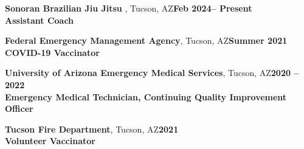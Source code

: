 \textbf{Sonoran Brazilian Jiu Jitsu }, Tucson, AZ\hfill\textbf{Feb 2024-- Present}\\
\textbf{Assistant Coach}\hfill
\vspace{-3mm}\\\vspace{-1mm}

\textbf{Federal Emergency Management Agency}, Tucson, AZ\hfill\textbf{Summer 2021}\\
\textbf{COVID-19 Vaccinator}\hfill
\vspace{-3mm}\\\vspace{-1mm}

\textbf{University of Arizona Emergency Medical Services}, Tucson, AZ\hfill\textbf{2020 --2022}\\
\textbf{Emergency Medical Technician, Continuing Quality Improvement Officer}\hfill
\vspace{-3mm}\\\vspace{-1mm}

\textbf{Tucson Fire Department}, Tucson, AZ\hfill\textbf{2021}\\
\textbf{Volunteer Vaccinator}\hfill
\vspace{-3mm}\\\vspace{-1mm}